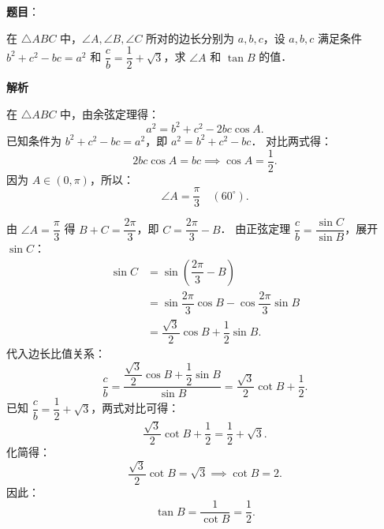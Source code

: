 \begin{answer}

\textbf{题目}：

在 $\triangle ABC$ 中，$\angle A, \angle B, \angle C$ 所对的边长分别为 $a, b, c$，设 $a, b, c$ 满足条件 $b^2 + c^2 - bc = a^2$ 和 $\dfrac{c}{b} = \dfrac{1}{2} + \sqrt{3}$，求 $\angle A$ 和 $\tan B$ 的值．

\textbf{解析}

在 $\triangle ABC$ 中，由余弦定理得：
\nopagebreak[4]
\[
a^2 = b^2 + c^2 - 2bc \cos A.
\]
已知条件为 $b^2 + c^2 - bc = a^2$，即 $a^2 = b^2 + c^2 - bc$．
对比两式得：
\nopagebreak[4]
\[
2bc \cos A = bc \implies \cos A = \dfrac{1}{2}.
\]
因为 $A \in (0, \pi)$，所以：
\nopagebreak[4]
\[
\angle A = \dfrac{\pi}{3} \quad (60^\circ).
\]

由 $\angle A = \dfrac{\pi}{3}$ 得 $B + C = \dfrac{2\pi}{3}$，即 $C = \dfrac{2\pi}{3} - B$．
由正弦定理 $\dfrac{c}{b} = \dfrac{\sin C}{\sin B}$，展开 $\sin C$：
\nopagebreak[4]
\[
\begin{aligned}
\sin C &= \sin\left(\dfrac{2\pi}{3} - B\right) \\
&= \sin\dfrac{2\pi}{3} \cos B - \cos\dfrac{2\pi}{3} \sin B \\
&= \dfrac{\sqrt{3}}{2} \cos B + \dfrac{1}{2} \sin B.
\end{aligned}
\]
代入边长比值关系：
\nopagebreak[4]
\[
\dfrac{c}{b} = \dfrac{\dfrac{\sqrt{3}}{2}\cos B + \dfrac{1}{2}\sin B}{\sin B} = \dfrac{\sqrt{3}}{2} \cot B + \dfrac{1}{2}.
\]
已知 $\dfrac{c}{b} = \dfrac{1}{2} + \sqrt{3}$，两式对比可得：
\nopagebreak[4]
\[
\dfrac{\sqrt{3}}{2} \cot B + \dfrac{1}{2} = \dfrac{1}{2} + \sqrt{3}.
\]
化简得：
\nopagebreak[4]
\[
\dfrac{\sqrt{3}}{2} \cot B = \sqrt{3} \implies \cot B = 2.
\]
因此：
\nopagebreak[4]
\[
\tan B = \dfrac{1}{\cot B} = \dfrac{1}{2}.
\]


\end{answer}
